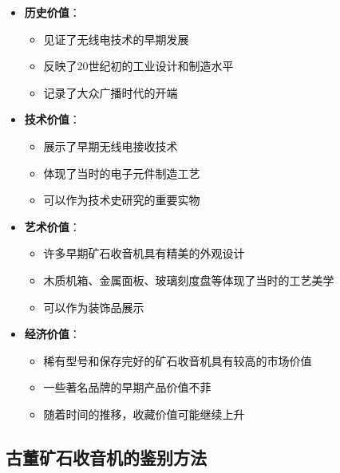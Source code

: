 \documentclass[12pt,UTF8]{ctexbook}
\begin{document}
\begin{itemize}[leftmargin=3.5em]
    \item \textbf{历史价值}：
        \begin{itemize}[leftmargin=3.5em]
            \item 见证了无线电技术的早期发展
            \item 反映了20世纪初的工业设计和制造水平
            \item 记录了大众广播时代的开端
        \end{itemize}
    \item \textbf{技术价值}：
        \begin{itemize}[leftmargin=3.5em]
            \item 展示了早期无线电接收技术
            \item 体现了当时的电子元件制造工艺
            \item 可以作为技术史研究的重要实物
        \end{itemize}
    \item \textbf{艺术价值}：
        \begin{itemize}[leftmargin=3.5em]
            \item 许多早期矿石收音机具有精美的外观设计
            \item 木质机箱、金属面板、玻璃刻度盘等体现了当时的工艺美学
            \item 可以作为装饰品展示
        \end{itemize}
    \item \textbf{经济价值}：
        \begin{itemize}[leftmargin=3.5em]
            \item 稀有型号和保存完好的矿石收音机具有较高的市场价值
            \item 一些著名品牌的早期产品价值不菲
            \item 随着时间的推移，收藏价值可能继续上升
        \end{itemize}
\end{itemize}

\subsection{古董矿石收音机的鉴别方法}
\end{document}
